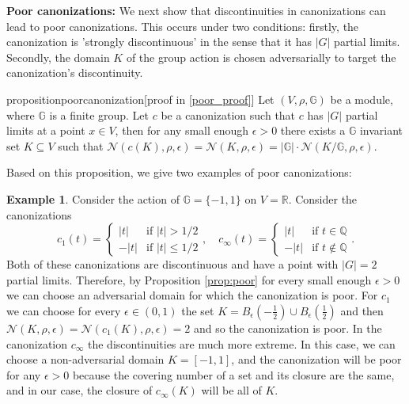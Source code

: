 \documentclass{article}
\theoremstyle{definition}
\newtheorem{example}[definition]{Example}
\theoremstyle{plain}
\newcommand{\G}{\mathbb{G}}
\newcommand{\N}{\mathcal{N}}
\newcommand{\RR}{\mathbb{R}}
\newcommand{\twopartdef}[4]
{
	\left\{
		\begin{array}{ll}
			#1 & \mbox{if } #2 \\
			#3 & \mbox{if } #4
		\end{array}
	\right.
}
\begin{document}
\textbf{Poor canonizations:} We next show that discontinuities in canonizations can lead to poor canonizations. This occurs under two conditions: firstly, the canonization is 'strongly discontinuous' in the sense that it has $|G|$ partial limits. Secondly, the domain $K$ of the group action is chosen adversarially to target the canonization's discontinuity. 
\begin{restatable}{proposition}{poorcanonization}[proof in \ref{poor_proof}]
\label{prop:poor}
    Let $(V,\rho,\G)$ be a module, where $\G$ is a finite group. Let $c$ be a canonization such that $c$ has $|G|$ partial limits at a point $x\in V$, then for any small enough $\epsilon>0$ there exists a $\G$ invariant set $K\subseteq V$ such that $\N(c(K),\rho,\epsilon)=\N(K,\rho,\epsilon)=|\G| \cdot \N(K/\G,\rho,\epsilon)$. 
\end{restatable}


Based on this proposition, we give two examples of poor canonizations:

\begin{example}\label{ex:sign_poor}
Consider the action of $\G=\{-1,1\}$ on $V=\RR $. Consider the canonizations
$$c_1(t)=\twopartdef{|t|}{|t|>1/2}{-|t|}{|t|\leq 1/2}, \quad  c_\infty(t)=\twopartdef{|t|}{t\in \mathbb{Q}}{-|t|}{t\not \in \mathbb{Q}} .$$
Both of these canonizations are discontinuous and have a point with $|G|=2 $ partial limits. Therefore, by  Proposition \ref{prop:poor} for every small enough $\epsilon>0$ we can choose an adversarial domain for which the canonization is poor. For $c_1$ we can choose for every $\epsilon\in (0,1)$ the set  $K=B_\epsilon(-\frac{1}{2})\cup B_\epsilon(\frac{1}{2})$ and then $\N(K,\rho,\epsilon)=\N(c_1(K),\rho,\epsilon)=2$ and so the canonization is poor. %
In the canonization $c_\infty$ the discontinuities are much more extreme. In this case, we can choose a non-adversarial domain $K=[-1,1]$, and the canonization will be poor for any $\epsilon>0$ because the covering number of a set and its closure are the same, and in our case, the closure of $c_{\infty}(K)$ will be all of $K$. 
\end{example}
\end{document}
